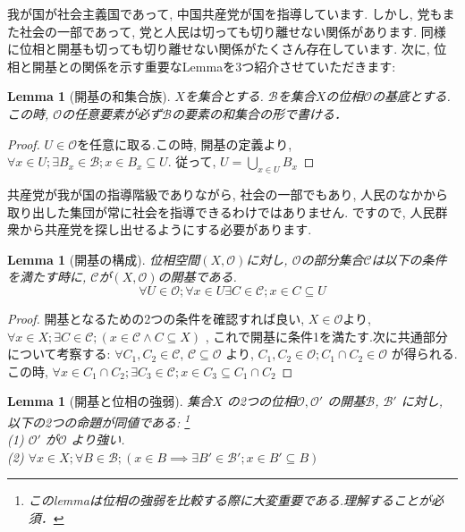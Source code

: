\documentclass[lualatex]{ltjsbook}
\newtheorem{lemma}[theorem]{Lemma}
\theoremstyle{remark}
\theoremstyle{plain}
\begin{document}
我が国が社会主義国であって,  中国共産党が国を指導しています. しかし,  党もまた社会の一部であって,  党と人民は切っても切り離せない関係があります. 同様に位相と開基も切っても切り離せない関係がたくさん存在しています.
次に,  位相と開基との関係を示す重要なLemmaを3つ紹介させていただきます:

\begin{lemma}[開基の和集合族]
	$X$を集合とする. $\mathcal{B}$を集合$X$の位相$\mathcal{O}$の基底とする.この時,  $\mathcal{O}$の任意要素が必ず$\mathcal{B}$の要素の和集合の形で書ける．
\end{lemma}

\begin{proof}
	$U\in \mathcal{O}$を任意に取る.この時,  開基の定義より,  $\forall x \in U ; \exists B_x \in \mathcal{B}; x \in B_x \subseteq U.$ 従って,  $U=\bigcup_{x \in U}B_x$
\end{proof}




共産党が我が国の指導階級でありながら,  社会の一部でもあり,  人民のなかから取り出した集団が常に社会を指導できるわけではありません. ですので,  人民群衆から共産党を探し出せるようにする必要があります.

\begin{lemma}[開基の構成]\label{lem:1od}
	位相空間$(X, \mathcal{O})$に対し,  $\mathcal{O}$の部分集合$\mathcal{C}$は以下の条件を満たす時に,  $\mathcal{C}$が$(X, \mathcal{O})$の開基である.
	$$\forall U \in \mathcal{O};\forall x \in U \exists C \in \mathcal{C}; x \in C \subseteq U$$
\end{lemma}

\begin{proof}
	開基となるための2つの条件を確認すれば良い,  
	$X \in \mathcal{O}$より,  
	$\forall x \in X; \exists C \in \mathcal{C}; \left( x \in \mathcal{C} \land C \subseteq X  \right)  $ , 
	これで開基に条件1を満たす.次に共通部分について考察する: 
	$\forall C_1 ,  C_2  \in \mathcal{C} $, 
	$ \mathcal{C} \subseteq \mathcal{O}$ より,  
	$C_1 ,  C_2 \in \mathcal{O}; C_1 \cap C_2 \in \mathcal{O}$ が得られる.
	この時,  $\forall x \in C_1 \cap C_2; \exists C_3 \in \mathcal{C} ; x \in C_3 \subseteq C_1 \cap C_2$
\end{proof}






\begin{lemma}[開基と位相の強弱]
	集合$X$ の2つの位相$\mathcal{O} ,  \mathcal{O'}$ の開基$ \mathcal{B}$,  $ \mathcal{B'}$ に対し,  
	以下の2つの命題が同値である: \footnote{このlemmaは位相の強弱を比較する際に大変重要である.理解することが必須．}\\
	(1) $\mathcal{O'}$ が$\mathcal{O}$ より強い.\\
	(2) $\forall x \in X; \forall B \in \mathcal{B} ; \left( x \in B \implies  \exists B' \in  \mathcal{B'} ; x \in B' \subseteq B \right) $
\end{lemma}
\end{document}
